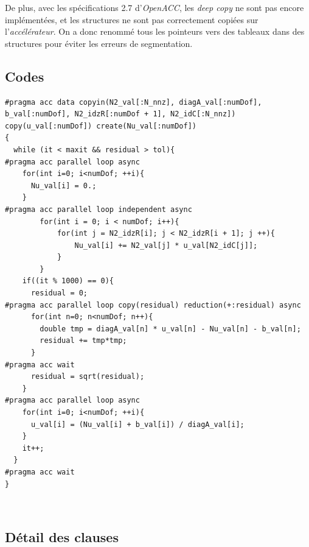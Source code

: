 \documentclass{article}
\begin{document}
De plus, avec les spécifications 2.7 d'\textit{OpenACC}, les \textit{deep copy} ne sont pas encore implémentées, et les structures ne sont pas correctement copiées sur l'\textit{accélérateur}. On a donc renommé tous les pointeurs vers des tableaux dans des structures pour éviter les erreurs de segmentation.

\subsection{Codes}

\begin{lstlisting}[caption="Optimisation du solveur de Jacobi"]
#pragma acc data copyin(N2_val[:N_nnz], diagA_val[:numDof], b_val[:numDof], N2_idzR[:numDof + 1], N2_idC[:N_nnz]) copy(u_val[:numDof]) create(Nu_val[:numDof])
{
  while (it < maxit && residual > tol){
#pragma acc parallel loop async
    for(int i=0; i<numDof; ++i){
      Nu_val[i] = 0.;
    }
#pragma acc parallel loop independent async
		for(int i = 0; i < numDof; i++){
			for(int j = N2_idzR[i]; j < N2_idzR[i + 1]; j ++){
				Nu_val[i] += N2_val[j] * u_val[N2_idC[j]];
			}
		}
    if((it % 1000) == 0){
      residual = 0;
#pragma acc parallel loop copy(residual) reduction(+:residual) async
      for(int n=0; n<numDof; n++){
        double tmp = diagA_val[n] * u_val[n] - Nu_val[n] - b_val[n];
        residual += tmp*tmp;
      }
#pragma acc wait
      residual = sqrt(residual);
    }
#pragma acc parallel loop async
    for(int i=0; i<numDof; ++i){
      u_val[i] = (Nu_val[i] + b_val[i]) / diagA_val[i];
    }
    it++;
  }
#pragma acc wait
}
\end{lstlisting}

~\\


\subsection{Détail des clauses}
\end{document}
